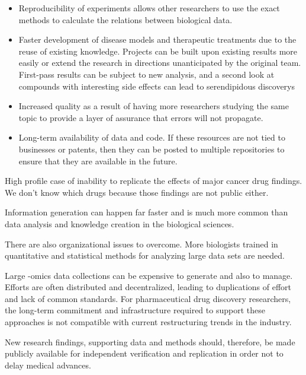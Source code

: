 \begin{itemize}

\item Reproducibility of experiments allows other researchers to use the exact methods to calculate the relations between biological data.

\item Faster development of disease models and therapeutic treatments due to the reuse of existing knowledge. Projects can be built upon existing results more easily or extend the research in directions unanticipated by the original team. First-pass results can be subject to new analysis, and a second look at compounds with interesting side effects can lead to serendipidous discoverys

\item Increased quality as a result of having more researchers studying the same topic to provide a layer of assurance that errors will not propagate.

\item Long-term availability of data and code. If these resources are not tied to businesses or patents, then they can be posted to multiple repositories to ensure that they are available in the future.
\cite{Prlic2012}

\end{itemize}

High profile case of inability to replicate the effects of major cancer drug findings. \cite{} We don't know which drugs because those findings are not public either.

Information generation can happen far faster and is much more common than data analysis and knowledge creation in the biological sciences.

There are also organizational issues to overcome. More biologists trained in quantitative and statistical methods for analyzing large data sets are needed. 

Large -omics data collections can be expensive to generate and also to manage. Efforts are often distributed and decentralized, leading to duplications of effort and lack of common standards. For pharmaceutical drug discovery researchers, the long-term commitment and infrastructure required to support these approaches is not compatible with current restructuring trends in the industry.\cite{Berg2014}

New research findings, supporting data and methods should, therefore, be made publicly available for independent verification and replication in order not to delay medical advances.

